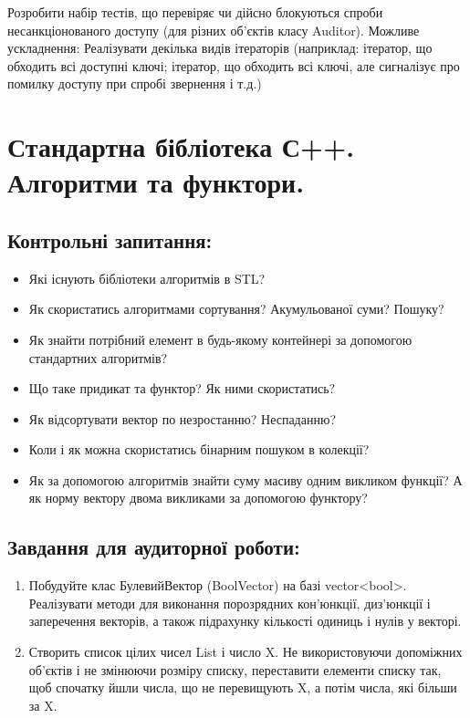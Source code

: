 \documentclass[a5paper,titlepage,openany,twoside,
]
{book_unv}%
\begin{document}
\begin{enumerate}
\begin{enumerate}
\begin{enumerate}
Розробити набір тестів, що перевіряє чи дійсно блокуються спроби несанкціонованого доступу (для різних об'єктів класу Auditor).
Можливе ускладнення:
Реалізувати декілька видів ітераторів (наприклад: ітератор, що обходить всі доступні ключі; 
ітератор, що обходить всі ключі, але сигналізує про помилку доступу при спробі звернення і т.д.) 
\end{enumerate}


\chapter{Стандартна бібліотека С++. Алгоритми та функтори.}
%

\section{Контрольні запитання:}
\begin{itemize}
\item
  Які існують бібліотеки алгоритмів в STL?
\item
  Як скористатись алгоритмами сортування? Акумульованої суми? Пошуку?
\item
  Як знайти потрібний елемент в будь-якому контейнері за допомогою
  стандартних алгоритмів?
\item
  Що таке придикат та функтор? Як ними скористатись?
\item
  Як відсортувати вектор по незростанню? Неспаданню?
\item
  Коли і як можна скористатись бінарним пошуком в колекції?
\item
  Як за допомогою алгоритмів знайти суму масиву одним викликом функції?
  А як норму вектору двома викликами за допомогою функтору?
\end{itemize}

\section{Завдання для аудиторної роботи:}

\begin{enumerate}
\def\labelenumi{\arabic{enumi})}

\item
Побудуйте клас БулевийВектор (BoolVector) на базі vector\textless{}bool\textgreater{}. 
Реалізувати методи для виконання порозрядних кон'юнкції, диз'юнкції і 
заперечення векторів, а також підрахунку кількості одиниць і нулів у векторі.
  
\item
  Створить список цілих чисел List і число X. Не використовуючи
  допоміжних об'єктів і не змінюючи розміру списку, переставити елементи
  списку так, щоб спочатку йшли числа, що не перевищують X, а потім
  числа, які більши за X.


\end{enumerate}
\end{enumerate}
\end{enumerate}
\end{document}
